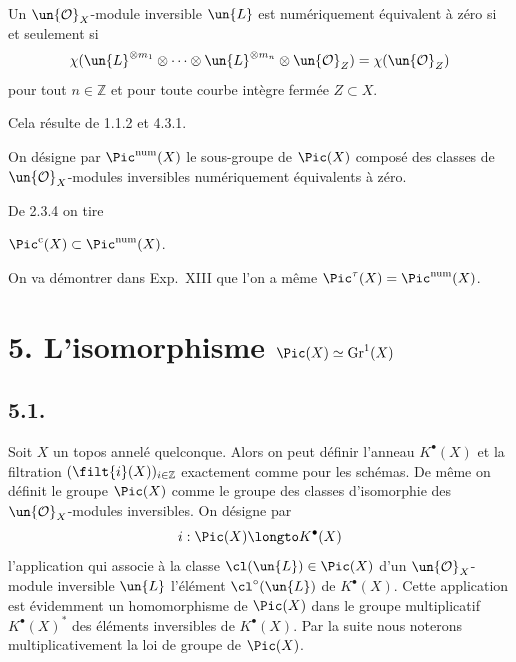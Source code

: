 \begin{proposition}[4.5.2]
Un $\un{\mathcal{O}}_{X}$-module inversible $\un{L}$ est num\'eriquement \'equivalent \`a z\'ero si et seulement si
\begin{equation}\label{eq:4.5.3}
\chi(\un{L}^{\otimes m_{1}} \otimes \dots \otimes \un{L}^{\otimes m_{n}} \otimes \un{\mathcal{O}}_{Z}) = \chi(\un{\mathcal{O}}_{Z})
\end{equation}
pour tout $n \in \mathbb{Z}$ et pour toute courbe int\`egre ferm\'ee $Z \subset X$.
\end{proposition}

Cela r\'esulte de 1.1.2 et 4.3.1.

On d\'esigne par $\Pic^{\mathrm{num}}(X)$ le sous-groupe de $\Pic(X)$ compos\'e des classes de $\un{\mathcal{O}}_{X}$-modules inversibles num\'eriquement \'equivalents \`a z\'ero.

De 2.3.4 on tire

\begin{corollaire}[4.5.3]
$\Pic^{\mathrm{c}}(X) \subset \Pic^{\mathrm{num}}(X)$.
\end{corollaire}

On va d\'emontrer dans Exp.\ XIII que l'on a m\^eme $\Pic^{\tau}(X) = \Pic^{\mathrm{num}}(X)$.

\section*{5. L'isomorphisme $\Pic(X) \simeq \mathrm{Gr}^{1}(X)$}

\subsection*{5.1.}

Soit $X$ un topos annel\'e quelconque. Alors on peut d\'efinir l'anneau $K^{\bullet}(X)$ et la filtration $(\filt{i}(X))_{i \in \mathbb{Z}}$ exactement comme pour les sch\'emas. De m\^eme on d\'efinit le groupe $\Pic(X)$ comme le groupe des classes d'isomorphie des $\un{\mathcal{O}}_{X}$-modules inversibles. On d\'esigne par
\begin{equation}\label{eq:5.1.1}
i : \Pic(X) \longto K^{\bullet}(X)
\end{equation}
l'application qui associe \`a la classe $\cl(\un{L}) \in \Pic(X)$ d'un $\un{\mathcal{O}}_{X}$-module inversible $\un{L}$ l'\'el\'ement $\cl^{\circ}(\un{L})$ de $K^{\bullet}(X)$. Cette application est \'evidemment un homomorphisme de $\Pic(X)$ dans le groupe multiplicatif $K^{\bullet}(X)^{*}$ des \'el\'ements inversibles de $K^{\bullet}(X)$. Par la suite nous noterons multiplicativement la loi de groupe de $\Pic(X)$.

